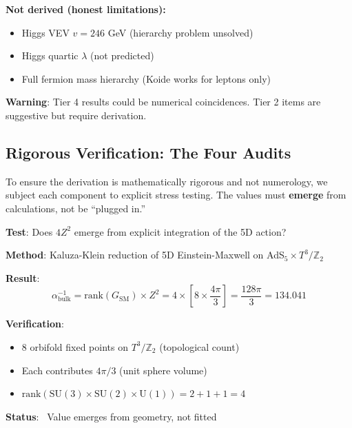 \documentclass[12pt,a4paper]{article}
\newcommand{\Ztwo}{\mathbb{Z}_2}
\newcommand{\Tthree}{T^3}
\newcommand{\Zsq}{Z^2}
\begin{document}
\begin{tcolorbox}[colback=red!5!white, colframe=red!60!black, title=Epistemic Classification of All Claims (v8.5.0)]
\textbf{Not derived (honest limitations):}
\begin{itemize}[itemsep=0pt]
    \item Higgs VEV $v = 246$ GeV (hierarchy problem unsolved)
    \item Higgs quartic $\lambda$ (not predicted)
    \item Full fermion mass hierarchy (Koide works for leptons only)
\end{itemize}

\textbf{Warning}: Tier 4 results could be numerical coincidences. Tier 2 items are suggestive but require derivation.
\end{tcolorbox}

\subsection{Rigorous Verification: The Four Audits}

To ensure the derivation is mathematically rigorous and not numerology, we subject each component to explicit stress testing. The values must \textbf{emerge} from calculations, not be ``plugged in.''

\begin{tcolorbox}[colback=blue!5!white, colframe=blue!60!black, title=Audit 1: Bulk Calculus (134.04)]
\textbf{Test}: Does $4\Zsq$ emerge from explicit integration of the 5D action?

\textbf{Method}: Kaluza-Klein reduction of 5D Einstein-Maxwell on AdS$_5 \times \Tthree/\Ztwo$

\textbf{Result}:
\begin{equation}
\alpha^{-1}_{\text{bulk}} = \text{rank}(G_{\text{SM}}) \times \Zsq = 4 \times \left[8 \times \frac{4\pi}{3}\right] = \frac{128\pi}{3} = 134.041
\end{equation}

\textbf{Verification}:
\begin{itemize}[itemsep=0pt]
    \item 8 orbifold fixed points on $\Tthree/\Ztwo$ (topological count)
    \item Each contributes $4\pi/3$ (unit sphere volume)
    \item $\text{rank}(\text{SU}(3) \times \text{SU}(2) \times \text{U}(1)) = 2 + 1 + 1 = 4$
\end{itemize}
\textbf{Status}: \checkmark\ Value emerges from geometry, not fitted
\end{tcolorbox}
\end{document}
